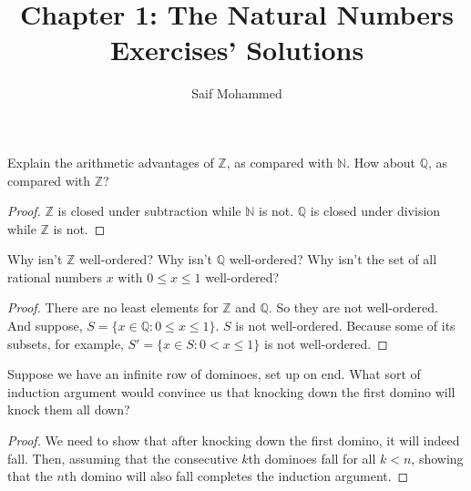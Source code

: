 \documentclass[12pt]{article}
\newenvironment{problem}[2][Problem]{\begin{trivlist}
\item[\hskip \labelsep {\bfseries #1}\hskip \labelsep {\bfseries #2.}]}{\end{trivlist}}
\begin{document}
%
%

\title{Chapter 1: The Natural Numbers Exercises' Solutions} %
\author{Saif Mohammed} %
\maketitle
\begin{problem}{a}
Explain the arithmetic advantages of \( \mathbb{Z} \), as compared with \( \mathbb{N} \). How about \( \mathbb{Q} \), as compared
with \( \mathbb{Z} \)?
\end{problem}

\begin{proof}
	$\mathbb{Z}$ is closed under subtraction while $\mathbb{N}$ is not. $\mathbb{Q}$ is closed under division while $\mathbb{Z}$ is not.

\end{proof}

\begin{problem}{b}
Why isn't \( \mathbb{Z} \) well-ordered? Why isn't \( \mathbb{Q} \) well-ordered? Why isn't the set of all rational
numbers \( x \) with \( 0 \leq x \leq 1 \) well-ordered?

\end{problem}

\begin{proof}
	There are no least elements for $\mathbb{Z}$ and $\mathbb{Q}$. So they are not well-ordered. \\
	And suppose, $S = \{ x\in \mathbb{Q}: 0 \leq x \leq 1 \}$. $S$ is not well-ordered. Because some of its subsets, for example, $S' = \{ x\in S: 0 < x \leq 1 \}$ is not well-ordered.

\end{proof}

\begin{problem}{c}
Suppose we have an infinite row of dominoes, set up on end. What sort of induction
argument would convince us that knocking down the first domino will knock them all
down?

\end{problem}

\begin{proof}
	We need to show that after knocking down the first domino, it will indeed fall. Then, assuming that the consecutive \(k\)th dominoes fall for all \(k < n\), showing that the \(n\)th domino will also fall completes the induction argument.

\end{proof}
\end{document}
